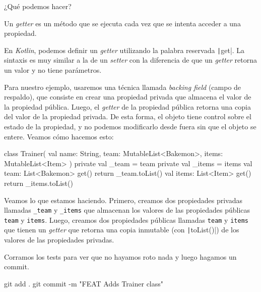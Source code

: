  ¿Qué podemos hacer?

  \begin{defaultbox}[Getter]
    Un \textit{getter} es un método que se ejecuta cada vez que se intenta acceder a una propiedad.
  \end{defaultbox}

  En \textit{Kotlin}, podemos definir un \textit{getter} utilizando la palabra reservada 
  \texttt|get|.
  La sintaxis es muy similar a la de un \textit{setter} con la diferencia de que un \textit{getter}
  retorna un valor y no tiene parámetros.

  Para nuestro ejemplo, usaremos una técnica llamada \textit{backing field} (campo de respaldo), que
  consiste en crear una propiedad privada que almacena el valor de la propiedad pública.
  Luego, el \textit{getter} de la propiedad pública retorna una copia del valor de la propiedad
  privada.
  De esta forma, el objeto tiene control sobre el estado de la propiedad, y no podemos modificarlo
  desde fuera sin que el objeto se entere.
  Veamos cómo hacemos esto:

  \begin{kotlin}
    class Trainer(
      val name: String,
      team: MutableList<Bakemon>,
      items: MutableList<Item>
    ) {
      private val _team = team
      private val _items = items
      val team: List<Bakemon>
        get() {
          return _team.toList()
        }
      val items: List<Item>
        get() {
          return _items.toList()
        }
    }
  \end{kotlin}

  Veamos lo que estamos haciendo.
  Primero, creamos dos propiedades privadas llamadas \texttt{\_team} y \texttt{\_items} que almacenan
  los valores de las propiedades públicas \texttt{team} y \texttt{items}.
  Luego, creamos dos propiedades públicas llamadas \texttt{team} y \texttt{items} que tienen un
  \textit{getter} que retorna una copia inmutable (con \texttt|toList()|) de los
  valores de las propiedades privadas.

  Corramos los tests para ver que no hayamos roto nada y luego hagamos un commit.

  \begin{powershell}
    git add .
    git commit -m "FEAT Adds Trainer class"
  \end{powershell}